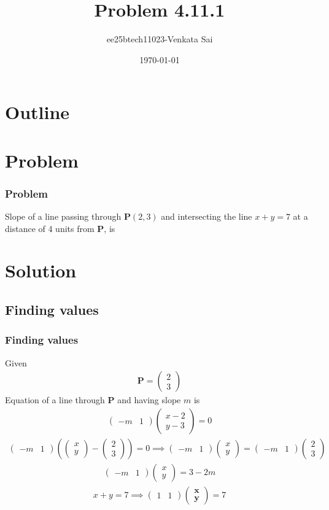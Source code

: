 \documentclass{beamer}
\title{Problem 4.11.1}
\author{ee25btech11023-Venkata Sai}
\date{\today}
\providecommand{\brak}[1]{\ensuremath{\left(#1\right)}}
\theoremstyle{remark}
\newcommand{\myvec}[1]{\ensuremath{\begin{pmatrix}#1\end{pmatrix}}}
\let\vec\mathbf
\numberwithin{equation}{section}
\begin{document}
\begin{frame}
\titlepage
\end{frame}

\section*{Outline}
\begin{frame}
\tableofcontents
\end{frame}

\section{Problem}

\begin{frame}
\frametitle{Problem}
\setcounter{section}{1}
Slope of a line passing through $\vec{P}\brak{2,3}$ and intersecting the line $x+y=7$ at a distance of 4 units from $\vec{P}$, is
\end{frame}
\section{Solution}

\subsection{Finding values}
\begin{frame}
\frametitle{Finding values}
Given  
\begin{align}
\vec{P}=\myvec{2\\3}
\end{align}
Equation of a line through $\vec{P}$ and having slope $m$ is
\begin{align}
 \myvec{-m & 1}\myvec{x-2 \\ y-3}=0  
 \end{align}
 \begin{align}
 \myvec{-m & 1}\brak{\myvec{x\\y}-\myvec{2\\3}}=0 \implies \myvec{-m & 1}\myvec{x\\y}=\myvec{-m & 1}\myvec{2\\3}
\end{align}
\begin{align}
\myvec{-m & 1}\myvec{x\\y}=3-2m
\end{align}
\begin{align}
  x+y=7 \implies  \myvec{1 & 1}\myvec{\vec{x}\\\vec{y}}=7
\end{align}
\end{frame}
\end{document}
